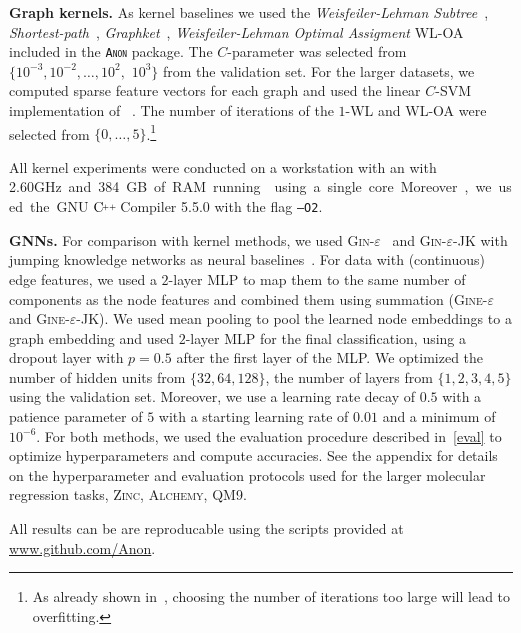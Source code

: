 \documentclass{article}
\newcommand{\xhdr}[1]{{\noindent\bfseries #1}}
\theoremstyle{definition}
\newcommand{\CC}[1][]{$\text{C\hspace{-.25ex}}^{_{_{_{++}}}}
	\ifthenelse{\equal{#1}{}}{}{\text{\hspace{-.625ex}#1}}$}
\newcommand{\new}[1]{\emph{#1}}
\begin{document}
\xhdr{Graph kernels.} As kernel baselines we used the \new{Weisfeiler-Lehman Subtree}~\cite{She+2011}, \new{Shortest-path}~\cite{Bor+2005}, \new{Graphket}~\cite{She+2009}, \new{Weisfeiler-Lehman Optimal Assigment} \textsc{WL-OA}~\cite{Kri+2016} included in the \textsc{\texttt{Anon}} package. The $C$-parameter was selected from $\{10^{-3}, 10^{-2}, \dotsc, 10^{2},$ $10^{3}\}$ from the validation set. For the larger datasets, we computed sparse feature vectors for each graph and used the linear $C$-SVM implementation of ~\cite{Fan+2008}. The number of iterations of the \textsc{$1$-WL} and \textsc{WL-OA} were selected from $\{0,\dotsc,5\}$.\footnote{As already shown in~\cite{She+2011}, choosing the number of iterations too large will lead to overfitting.}

All kernel experiments were conducted on a workstation with an  with 2.60\si GHz and 384\si GB of RAM running  using a single core. Moreover, we used the GNU \CC Compiler 5.5.0 with the flag \texttt{--O2}. 

\xhdr{GNNs.} 
For comparison with kernel methods, we used \textsc{Gin-$\varepsilon$}~\cite{Xu+2018b} and \textsc{Gin-$\varepsilon$-JK} with jumping knowledge networks as neural baselines~\cite{Xu+2018}. For data with (continuous) edge features, we used a $2$-layer MLP to map them to the same number of components as the node features and combined them using summation (\textsc{Gine-$\varepsilon$} and \textsc{Gine-$\varepsilon$}-JK). We used mean pooling to pool the learned node embeddings to a graph embedding and used $2$-layer MLP for the final classification, using a dropout layer with $p = 0.5$ after the first layer of the MLP. We optimized the number of hidden units from $
\{ 32, 64, 128\}$, the number of layers from $ \{1, 2, 3, 4, 5\}$ using the validation set. Moreover, we use a learning rate decay of $0.5$ with a patience parameter of $5$ with a starting learning rate of $0.01$ and a minimum of $10^{-6}$. For both methods, we used the evaluation procedure described in~\cref{eval} to optimize hyperparameters and compute accuracies. See the appendix for details on the hyperparameter and evaluation protocols used for the larger molecular regression tasks, \textsc{Zinc}, \textsc{Alchemy},  \textsc{QM9}.

All results can be are reproducable using the scripts provided at \url{www.github.com/Anon}.
\end{document}
